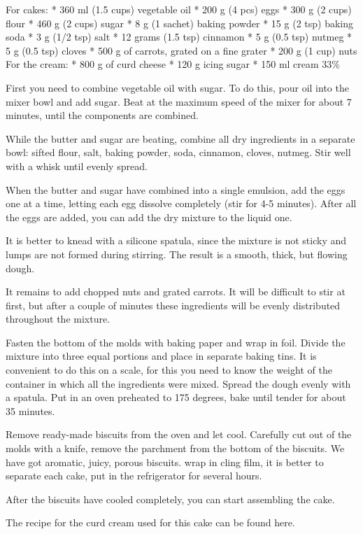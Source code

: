 \documentclass[
]{book}
\begin{document}
For cakes:
* 360 ml (1.5 cups) vegetable oil
* 200 g (4 pcs) eggs
* 300 g (2 cups) flour
* 460 g (2 cups) sugar
* 8 g (1 sachet) baking powder
* 15 g (2 tsp) baking soda
* 3 g (1/2 tsp) salt
* 12 grams (1.5 tsp) cinnamon
* 5 g (0.5 tsp) nutmeg
* 5 g (0.5 tsp) cloves
* 500 g of carrots, grated on a fine grater
* 200 g (1 cup) nuts
For the cream:
* 800 g of curd cheese
* 120 g icing sugar
* 150 ml cream 33\%

First you need to combine vegetable oil with sugar. To do this, pour oil into the mixer bowl and add sugar. Beat at the maximum speed of the mixer for about 7 minutes, until the components are combined.

While the butter and sugar are beating, combine all dry ingredients in a separate bowl: sifted flour, salt, baking powder, soda, cinnamon, cloves, nutmeg. Stir well with a whisk until evenly spread.

When the butter and sugar have combined into a single emulsion, add the eggs one at a time, letting each egg dissolve completely (stir for 4-5 minutes). After all the eggs are added, you can add the dry mixture to the liquid one.

It is better to knead with a silicone spatula, since the mixture is not sticky and lumps are not formed during stirring. The result is a smooth, thick, but flowing dough.

It remains to add chopped nuts and grated carrots. It will be difficult to stir at first, but after a couple of minutes these ingredients will be evenly distributed throughout the mixture.

Fasten the bottom of the molds with baking paper and wrap in foil. Divide the mixture into three equal portions and place in separate baking tins. It is convenient to do this on a scale, for this you need to know the weight of the container in which all the ingredients were mixed. Spread the dough evenly with a spatula. Put in an oven preheated to 175 degrees, bake until tender for about 35 minutes.

Remove ready-made biscuits from the oven and let cool. Carefully cut out of the molds with a knife, remove the parchment from the bottom of the biscuits. We have got aromatic, juicy, porous biscuits. wrap in cling film, it is better to separate each cake, put in the refrigerator for several hours.

After the biscuits have cooled completely, you can start assembling the cake.

The recipe for the curd cream used for this cake can be found here.
\end{document}
